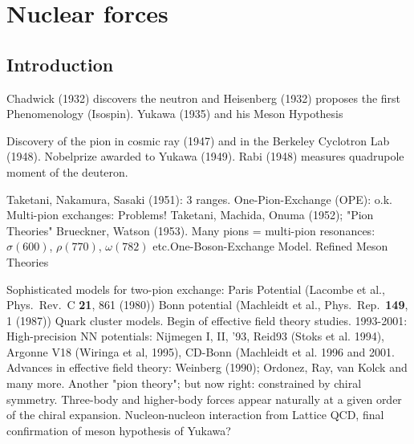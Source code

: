 \chapter{Nuclear forces}

\section{Introduction}
Chadwick (1932) discovers the neutron and Heisenberg (1932) proposes the first Phenomenology (Isospin).  
Yukawa (1935) and his Meson Hypothesis       

Discovery of the pion in cosmic ray (1947) and in the Berkeley Cyclotron Lab (1948).
Nobelprize awarded to Yukawa (1949).  Rabi (1948) measures quadrupole moment of the deuteron.

Taketani, Nakamura, Sasaki (1951): 3 ranges.      One-Pion-Exchange (OPE): o.k.
Multi-pion exchanges: Problems!   Taketani, Machida, Onuma (1952);
"Pion Theories" Brueckner, Watson (1953).
Many pions = multi-pion resonances:
$\sigma(600)$,  $\rho(770)$,  $\omega(782)$ etc.One-Boson-Exchange Model.
Refined Meson Theories

Sophisticated models for two-pion exchange:
       Paris Potential (Lacombe et al., Phys.~Rev.~C {\bf 21}, 861 (1980))
       Bonn potential (Machleidt et al., Phys.~Rep.~{\bf 149}, 1 (1987))
Quark cluster models. Begin of effective field theory studies.
1993-2001: High-precision NN potentials: Nijmegen I, II, '93, Reid93 (Stoks et al. 1994), 
Argonne V18 (Wiringa et al, 1995), CD-Bonn (Machleidt et al. 1996 and 2001. 
Advances in effective field theory: Weinberg (1990); Ordonez, Ray, van Kolck and many more.
           Another "pion theory"; but now right: constrained by chiral symmetry. Three-body and higher-body forces
appear naturally at a given order of the chiral expansion. 
Nucleon-nucleon interaction from Lattice QCD, final confirmation of meson hypothesis of Yukawa? 

